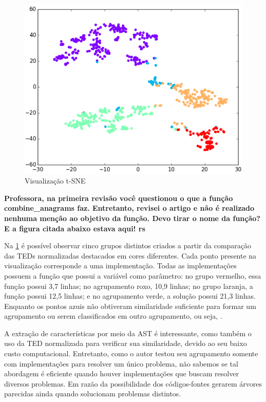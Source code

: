 	    \begin{figure}[ht]
	        \centering
	        \includegraphics[scale=0.5]{imagem/visualizacao-tSNE.png}
	        \captionsetup{justification=centering}
	        \caption[Visualização t-SNE]{Visualização t-SNE \cite{Yin:2015}}
	        \label{fig:t-SNE}
	    \end{figure}
	    
	    \textbf{Professora, na primeira revisão você questionou o que a função
	    	combine\_anagrams faz. Entretanto, revisei o artigo e não é realizado
	    	nenhuma menção ao objetivo da função. Devo tirar o nome da função? E
	    	a figura citada abaixo estava aqui! rs}
	    
	    Na \cref{fig:t-SNE} é possível observar cinco grupos distintos
	    criados a partir da comparação das TEDs normalizadas destacados em cores
	    diferentes. Cada ponto presente na visualização corresponde a uma
	    implementação. Todas as implementações possuem a função 
	    que possui a variável  como parâmetro: no grupo vermelho,
	    essa função possui 3,7 linhas; no agrupamento roxo, 10,9 linhas; no
	    grupo laranja, a função possui 12,5 linhas; e no agrupamento verde,
	    a solução possui 21,3 linhas. Enquanto os pontos azuis não obtiveram
	    similaridade suficiente para formar um agrupamento ou serem classificados
	    em outro agrupamento, ou seja, . 

		A extração de características por meio da AST é interessante, como também
		o uso da TED normalizada para verificar sua similaridade, devido ao seu
		baixo custo computacional. Entretanto, como o autor testou seu agrupamento
		somente com implementações para resolver um único problema, não sabemos se
		tal abordagem é eficiente quando houver implementações que buscam resolver
		diversos problemas. Em razão da possibilidade dos códigos-fontes gerarem
		árvores parecidas ainda quando solucionam problemas distintos.
	    
